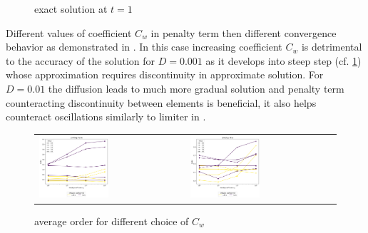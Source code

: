 \begin{example}
\begin{figure}[h]
	\caption{ exact solution at $t = 1$}
	\label{fig:burgess_hesthaven_ext}
\end{figure}
Different values of coefficient $C_w$ in penalty term then different convergence 
behavior as demonstrated in . In this case increasing 
coefficient $C_w$ is detrimental to the accuracy of the solution for $D=0.001$ as it 
develops into steep step (cf. \cref{fig:burgess_hesthaven_ext}) whose approximation 
requires discontinuity in approximate solution. For $D=0.01$ the diffusion leads to much 
more gradual solution and penalty term counteracting discontinuity between elements is 
beneficial, it also helps counteract oscillations similarly to limiter in 
. 
\end{example}


\begin{figure}[h!]
	\centering
	\begin{tabular}{p{} p{}}
		\vspace{0pt} 
		\includegraphics[width=0.49\textwidth]{../figs/parametric/burgers_1D/orders_unlimited}
		&
		\vspace{0pt} 
		\includegraphics[width=0.49\textwidth]{../figs/parametric/burgers_1D/orders_limited}
	\end{tabular}
	\caption{ average order for different choice of $C_w$}
	\label{fig:burgess_ordersunlimited}
\end{figure}


